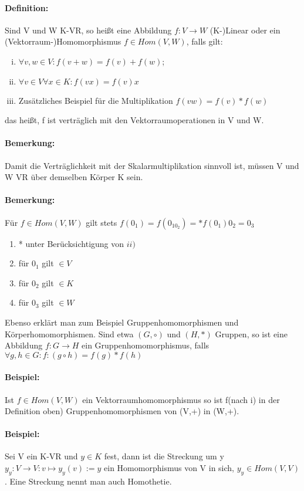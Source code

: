 \paragraph{Definition:}
	Sind V und W K-VR, so heißt eine Abbildung $f: V \rightarrow W$ (K-)Linear oder ein (Vektorraum-)Homomorphismus $f\in Hom(V,W)$, falls gilt:

\begin{enumerate}[(i)]
	\item $\forall v,w \in V: f(v+w) = f(v) + f(w)$;
	\item $\forall v\in V \forall x\in K: f(vx) = f(v)x$
	\item Zusätzliches Beispiel für die Multiplikation $f(vw) = f(v) * f(w)$
\end{enumerate}
    das heißt, f ist verträglich mit den Vektorraumoperationen in V und W.
\paragraph{Bemerkung:} Damit die Verträglichkeit mit der Skalarmultiplikation sinnvoll ist, müssen V und W VR über demselben Körper K sein.
   \paragraph{Bemerkung:} Für $f\in Hom(V,W)$ gilt stets $f(0_1) = f(0_10_2) =* f(0_1)0_2 = 0_3$
   \begin{enumerate}
   	\item * unter Berücksichtigung von $ii)$
   	\item für $0_1$ gilt $\in V$
	\item für $0_2$ gilt $\in K$
	\item für $0_3$ gilt $\in W$
   \end{enumerate}
  Ebenso erklärt man zum Beispiel Gruppenhomomorphismen und Körperhomomorphismen. Sind etwa $(G,\circ)$ und $(H,*)$ Gruppen, so ist eine Abbildung $f: G \to H$ ein Gruppenhomomorphismus, falls $\forall g,h \in G: f:(g\circ h) = f(g) * f(h)$
\paragraph{Beispiel:}
	Ist $f\in Hom(V,W)$ ein Vektorraumhomomorphismus so ist f(nach i) in der Definition oben) Gruppenhomomorphismen von (V,+) in (W,+).
  
\paragraph{Beispiel:}
	Sei V ein K-VR und $y\in K$ fest, dann ist die Streckung um y $y_y:V\to V: v\mapsto y_y(v) := y$ ein Homomorphismus von V in sich, $y_y\in Hom(V,V)$. Eine Streckung nennt man auch Homothetie.
  	
